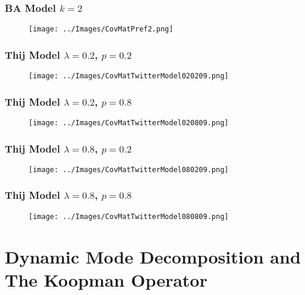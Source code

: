 \documentclass{beamer}
\begin{document}
\begin{frame}
    \frametitle{BA Model $k=2$}
    \begin{figure}
        \texttt{[image: ../Images/CovMatPref2.png]}
        \centering
    \end{figure}
\end{frame}

\begin{frame}
    \frametitle{Thij Model $\lambda=0.2$, $p=0.2$}
    \begin{figure}
        \texttt{[image: ../Images/CovMatTwitterModel020209.png]}
        \centering
    \end{figure}
\end{frame}


\begin{frame}
    \frametitle{Thij Model $\lambda=0.2$, $p=0.8$}
    \begin{figure}
        \texttt{[image: ../Images/CovMatTwitterModel020809.png]}
        \centering
    \end{figure}
\end{frame}

\begin{frame}
    \frametitle{Thij Model $\lambda=0.8$, $p=0.2$}
    \begin{figure}
        \texttt{[image: ../Images/CovMatTwitterModel080209.png]}
        \centering
    \end{figure}
\end{frame}


\begin{frame}
    \frametitle{Thij Model $\lambda=0.8$, $p=0.8$}
    \begin{figure}
        \texttt{[image: ../Images/CovMatTwitterModel080809.png]}
        \centering
    \end{figure}
\end{frame}



\section{Dynamic Mode Decomposition and The Koopman Operator}
\end{document}
